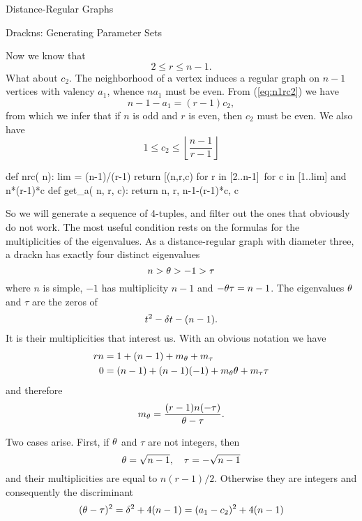 \begin{chap}{Distance-Regular Graphs}
\begin{sect}{Drackns: Generating Parameter Sets}
\begin{para}
Now we know that
\begin{equation}
\label{eq:rbnd}
    2\le r\le n-1.
\end{equation}
What about $c_2$. The neighborhood of a vertex induces a regular graph
on $n-1$ vertices with valency $a_1$, whence $na_1$ must be even.
From (\ref{eq:n1rc2}) we have 
\[
    n-1-a_1 = (r-1)c_2,
\]
from which we infer that if $n$ is odd and $r$ is even, then $c_2$ must be
even. We also have
\begin{equation}
\label{c2bnd}
    1\le c_2 \le \left\lfloor\frac{n-1}{r-1}\right\rfloor
\end{equation}
\end{para}
%
\begin{sagecode}
\begin{sageinput}
    def nrc( n):
        lim = (n-1)/(r-1)
        return [(n,r,c) for r in [2..n-1]\ 
         for c in [1..lim] and n*(r-1)*c %
    def get_a( n, r, c):
        return n, r, n-1-(r-1)*c, c
\end{sageinput}
\end{sagecode}
%
\begin{para}
So we will generate a sequence of 4-tuples, and filter out the ones
that obviously do not work. The most useful condition rests on the formulas
for the multiplicities of the eigenvalues. As a distance-regular graph
with diameter three, a drackn has exactly four distinct eigenvalues
\[
    n > \theta > -1 > \tau
\]
where $n$ is simple, $-1$ has multiplicity $n-1$ and $-\theta\tau=n-1$.
The eigenvalues $\theta$ and $\tau$ are the zeros of
\[
    t^2 -\delta t - (n-1).
\]
It is their multiplicities that interest us. With an obvious notation we have
\begin{align*}
    rn &= 1 + (n-1) +m_\theta+m_\tau\\
    0  &= (n-1) +(n-1)(-1) +m_\theta\theta+m_\tau\tau
\end{align*}
and therefore
\begin{equation}
\label{eq:mult}
    m_\theta = \frac{(r-1)n(-\tau)}{\theta -\tau}.
\end{equation}
\end{para}
%
\begin{para}
Two cases arise. First, if $\theta$ and $\tau$ are not integers, then
\[
    \theta=\sqrt{n-1},\quad \tau=-\sqrt{n-1}
\]
and their multiplicities are equal to $n(r-1)/2$. Otherwise they are integers
and consequently the discriminant
\begin{equation}
\label{eq:discr}
    (\theta-\tau)^2 = \delta^2+4(n-1) = (a_1-c_2)^2+4(n-1)
\end{equation}

\end{para}
\end{sect}
\end{chap}
